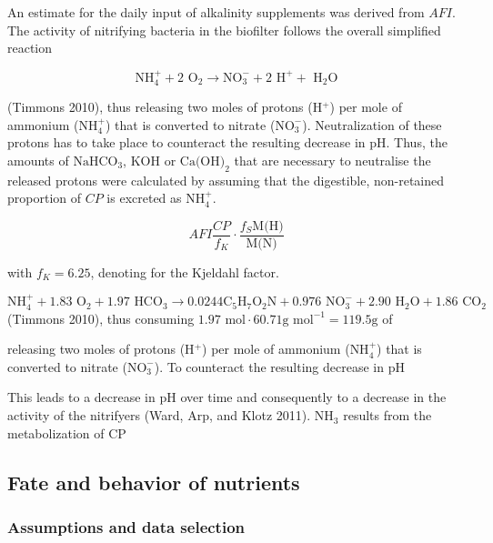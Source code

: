 \documentclass[
]{article}
\begin{document}
An estimate for the daily input of alkalinity supplements was derived from \(AFI\). The activity of nitrifying bacteria in the biofilter follows the overall simplified reaction

\[
\text{NH}_{4}^{+} + 2 \text{ O}_{2} \rightarrow \text{NO}_{3}^{-} + 2 \text{ H}^{+} + \text{ H}_{2}\text{O}
\]

(Timmons 2010), thus releasing two moles of protons (H\(^{+}\)) per mole of ammonium (\(\text{NH}_{4}^{+}\)) that is converted to nitrate (\(\text{NO}_{3}^{-}\)). Neutralization of these protons has to take place to counteract the resulting decrease in pH. Thus, the amounts of \(\text{NaHCO}_{3}\), \(\text{KOH}\) or \(\text{Ca(OH)}_{2}\) that are necessary to neutralise the released protons were calculated by assuming that the digestible, non-retained proportion of \(CP\) is excreted as \(\text{NH}_{4}^{+}\).

\[
AFI \frac{CP}{f_{K}} \cdot \frac{f_{S}\text{M(H)}}{\text{M(N)}}
\]

with \(f_{K} = 6.25\), denoting for the Kjeldahl factor.

\[
\text{NH}_{4}^{+} + 1.83 \text{ O}_{2} + 1.97 \text{ HCO}_{3} \rightarrow 0.0244 \text{C}_{5}\text{H}_{7}\text{O}_{2}\text{N} + 0.976 \text{ NO}_{3}^{-} + 2.90 \text{ H}_{2}\text{O} + 1.86 \text{ CO}_{2}
\]
(Timmons 2010), thus consuming \(1.97 \text{ mol} \cdot 60.71 \text{g mol}^{-1} = 119.5 \text{g}\) of

releasing two moles of protons (H\(^{+}\)) per mole of ammonium (\(\text{NH}_{4}^{+}\)) that is converted to nitrate (\(\text{NO}_{3}^{-}\)). To counteract the resulting decrease in pH

This leads to a decrease in pH over time and consequently to a decrease in the activity of the nitrifyers (Ward, Arp, and Klotz 2011). NH\(_{3}\) results from the metabolization of CP

\hypertarget{fate-and-behavior-of-nutrients}{%
\subsection{Fate and behavior of nutrients}\label{fate-and-behavior-of-nutrients}}

\hypertarget{assumptions-and-data-selection}{%
\subsubsection{Assumptions and data selection}\label{assumptions-and-data-selection}}
\end{document}
